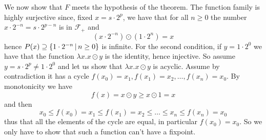\begin{example}
	We now show that $F$ meets the hypothesis of the theorem.
	The function family is highly surjective since, fixed $x = s \cdot 2^p$, we have that for all $n \ge 0$ the number
	$x \cdot 2^{-n} = s \cdot 2^{p-n}$ is in $\mathcal{F_+}$ and
	\[
	(x \cdot 2^{-n}) \odot (1 \cdot 2^{n}) = x
	\]
	hence $P(x) \supseteq \{ 1 \cdot 2^{-n} \,\vert\, n \ge 0 \}$ is infinite.
	For the second condition, if $y = 1 \cdot 2^{0}$ we have that the function $\lambda x. x \odot y$ is the identity, hence injective. So assume $y = s \cdot 2^p \neq 1 \cdot 2^0$ and let us show that $\lambda x. x \odot y$ is acyclic. Assume by contradiction it has a cycle $f(x_0) = x_1, f(x_1) = x_2, \dots, f(x_n) = x_0$. By monotonicity we have
	\[
	f(x) = x \odot y \ge x \odot 1 = x
	\]
	and then
	\[
	x_0 \le f(x_0) = x_1 \le f(x_1) = x_2 \le \dots \le x_n \le f(x_n) = x_0
	\]
	thus that all the elements of the cycle are equal, in particular $f(x_0) = x_0$. So we only have to show that such a function can't have a fixpoint.


\end{example}
